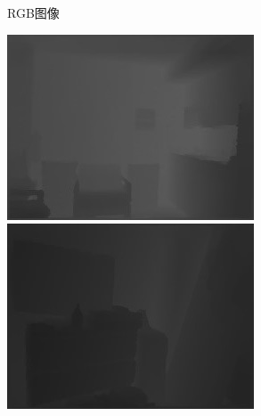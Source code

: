 \begin{figure}[htb]
\begin{subfigure}{0.24\linewidth}
\begin{minipage}[b]{1\linewidth}
  \end{minipage}
  \caption{RGB图像}
  \end{subfigure}
  \begin{subfigure}{0.24\linewidth}
  \begin{minipage}[b]{1\linewidth}
  \includegraphics[width=1\linewidth]{figure/Pixel_cla_nyu/1gt.jpg}\vspace{4pt}
  \includegraphics[width=1\linewidth]{figure/Pixel_cla_nyu/2gt.jpg}\vspace{4pt}

\end{minipage}
\end{subfigure}
\end{figure}
